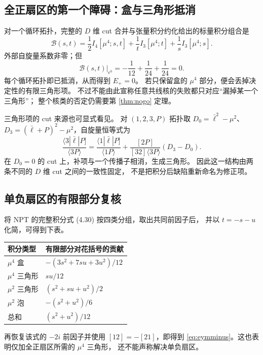 \documentclass[UTF8,a4paper,11pt,fontset=fandol]{ctexart}
\newcommand{\ang}[1]{\langle #1\rangle}
\newcommand{\sq}[1]{[#1]}
\begin{document}
\subsection{全正扇区的第一个障碍：盒与三角形抵消}
对一个循环拓扑，完整的 $D$ 维 cut 合并与张量积分约化给出的标量积分组合是\cite{NPT}
\begin{equation}
 \mathcal B(s,t)=\frac12 I_4[\mu^4;s,t]
 +\frac1tI_3[\mu^4;t]+\frac1sI_3[\mu^4;s].
\label{eq:boxtriangle}
\end{equation}
外部自旋量系数非零；但
\begin{equation}
 \mathcal B(s,t)\big|_{\epsilon^0}
 =-\frac1{12}+\frac1{24}+\frac1{24}=0.
\end{equation}
每个循环拓扑即已抵消，从而得到 $E_+=0$。
若只保留盒的 $\mu^4$ 部分，便会丢掉决定性的有限三角形项。
不过不能由此宣称任意共线核的失败都只对应“漏掉某一个三角形”；
整个核类的否定仍需要第 \ref{thm:nogo} 定理。

三角形项的 cut 来源也可显式看见。
对 $(1,2,3,P)$ 拓扑取
$D_0=\bar\ell^2-\mu^2$、$D_3=(\bar\ell+P)^2-\mu^2$，自旋量恒等式为
\begin{equation}
 \frac{\langle3|\bar\ell|P]}{\ang{3P}}
 =\frac{\langle1|\bar\ell|P]}{\ang{1P}}
 +\frac{\sq{2P}}{\sq{32}\ang{3P}}(D_3-D_0).
\end{equation}
在 $D_0=0$ 的 cut 上，补项与一个传播子相消，生成三角形。
因此这一结构由两条不同的 $D$ 维 cut 之间的一致性固定，
不是把积分后缺陷重新命名为修正项。

\subsection{单负扇区的有限部分复核}
将 NPT 的完整积分式 (4.30) 按四类分组，取出共同前因子后，
并以 $t=-s-u$ 化简，可得到下表。
\begin{center}
\begin{tabular}{ll}
\toprule
积分类型&有限部分对花括号的贡献\\\midrule
$\mu^4$ 盒&$-(3s^2+7su+3u^2)/12$\\
$\mu^4$ 三角形&$su/12$\\
$\mu^2$ 三角形&$(s^2+su+u^2)/2$\\
$\mu^2$ 泡&$-(s^2+u^2)/6$\\\midrule
总和&$(s^2+u^2)/12$\\\bottomrule
\end{tabular}
\end{center}
再恢复该式的 $-2i$ 前因子并使用 $\sq{12}=-\sq{21}$，即得到
\eqref{eq:eymminus}。这也表明仅加全正扇区所需的 $\mu^4$ 三角形，
还不能声称解决单负扇区。
\end{document}
